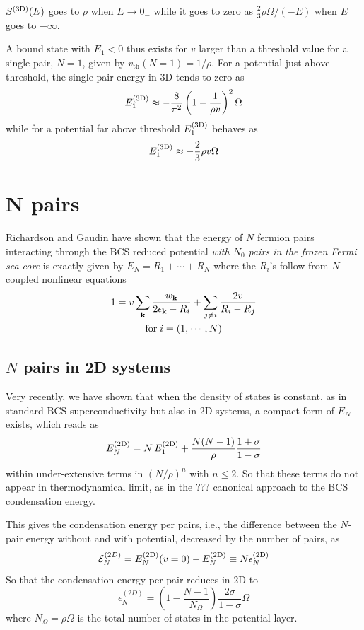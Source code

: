 \documentclass[aps,prb,showpacs,reprint]{revtex4-1}
\begin{document}
$S^{{\text{(3D)}}}(E)$ goes to $\rho$ when $E\rightarrow0_-$ while it goes to zero as $\frac{2}{3}\rho\Omega/(-E)$ when $E$ goes to $-\infty$. 

A bound state with $E_1<0$ thus exists for $v$ larger than a threshold value for a single pair, $N=1$, given by  $v_{\text{th}}(N=1)=1/\rho$.  For a potential just above threshold, the single pair energy in 3D tends to zero as 
\begin{equation}
E_1^{{\text{(3D)}}}\approx-\frac{8}{\pi^2}\left(1-\frac{1}{\rho{}v}\right)^2\Omega
\label{eq:E3Dsmall}
\end{equation}
while for a potential far above threshold $E_1^{{\text{(3D)}}}$ behaves as 
\begin{equation}
E_1^{{\text{(3D)}}}\approx-\frac{2}{3}\rho{v}\Omega
\label{eq:E3Dlarge}
\end{equation}


\section{N pairs\label{sec:NPair}}
Richardson \cite{Richardson1} and Gaudin \cite{gaudin} have shown that the energy of $N$ fermion pairs interacting through the BCS reduced potential \emph{with $N_0$  pairs in the frozen Fermi sea core} is exactly given by $E_N=R_1+\cdots+R_N$ where the $R_i$'s follow from $N$ coupled nonlinear equations 
\begin{multline}
 1=v\sum_{\mathbf{k}}\frac{w_{\mathbf{k}}}{2\epsilon_{\mathbf{k}}-R_i}+\sum_{j\neq{}i}\frac{2v}{R_i-R_j}\\\text{for}\;i=(1,\cdots,N)
\end{multline}
\subsection{$N$ pairs in 2D systems}
Very recently, we have shown that when the density of states is constant, as in standard BCS superconductivity but also in 2D systems, a compact form of $E_N$ exists, which reads as  
\begin{equation}
 E^{{\text{(2D)}}}_N=N\,E^{{\text{(2D)}}}_1+\frac{N(N-1)}{\rho}\frac{1+\sigma}{1-\sigma}
\end{equation}
within under-extensive terms in $(N/\rho)^n$ with $n\leq2$. So that these terms do not appear in thermodynamical limit, as in the ??? canonical approach to the BCS condensation energy. 

This gives the condensation energy per  pairs, i.e., the difference between the $N$-pair energy without and with potential, decreased by the number of pairs, as 
\begin{equation}
 \mathcal{E}^{(2D)}_N=E_N^{{{\text{(2D)}}}}(v=0)-E_N^{{\text{(2D)}}}\equiv{}N\epsilon_N^{{\text{(2D)}}}
 \end{equation}
 So that the condensation energy per pair reduces in 2D to
 \begin{equation}
\epsilon^{(2D)}_N=(1-\frac{N-1}{N_\Omega})\frac{2\sigma}{1-\sigma}\Omega\label{eq:E2D}
\end{equation}
where $N_\Omega=\rho\Omega$ is the total number of states in the potential layer. 
\end{document}
